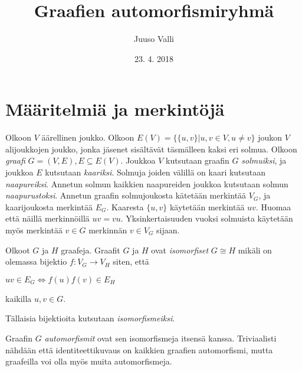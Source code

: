 \documentclass[a4paper, 12pt]{article}
\theoremstyle{definition}
\theoremstyle{plain}
\begin{document}
\title{Graafien automorfismiryhmä}
\author{Juuso Valli}
\date{23. 4. 2018}

\maketitle

\tableofcontents

\newpage

\section{Määritelmiä ja merkintöjä}

Olkoon $V$ äärellinen joukko. Olkoon $E(V) = \{\{u, v\} | u, v \in V, u \neq v\}$ joukon $V$ alijoukkojen joukko, jonka jäsenet sisältävät täsmälleen kaksi eri solmua.
Olkoon \emph{graafi} $G = (V, E), E \subseteq E(V)$. Joukkoa $V$ kutsutaan graafin $G$ \emph{solmuiksi}, ja joukkoa $E$ kutsutaan \emph{kaariksi}. Solmuja joiden välillä on kaari kutsutaan \emph{naapureiksi}. Annetun solmun kaikkien naapureiden joukkoa kutsutaan solmun \emph{naapurustoksi}. Annetun graafin solmujoukosta kätetään merkintää $V_G$, ja kaarijoukosta merkintää $E_G$.
Kaaresta $\{u, v\}$ käytetään merkintää $uv$. Huomaa että näillä merkinnöillä $uv = vu$.
Yksinkertaisuuden vuoksi solmuista käytetään myös merkintää $v \in G$ merkinnän $v \in V_G$ sijaan.

Olkoot $G$ ja $H$ graafeja. Graafit $G$ ja $H$ ovat \emph{isomorfiset} $G \cong H$ mikäli on olemassa bijektio $f: V_G \rightarrow V_H$ siten, että
\begin{center}
\begin{math}
uv \in E_G \Longleftrightarrow f(u)f(v) \in E_H
\end{math}
\end{center}
kaikilla $u, v \in G$.

Tällaisia bijektioita kutsutaan \emph{isomorfismeiksi}.

Graafin $G$ \emph{automorfismit} ovat sen isomorfismeja itsensä kanssa. Triviaalisti nähdään että identiteettikuvaus on kaikkien graafien automorfismi, mutta graafeilla voi olla myös muita automorfismeja.
\end{document}
